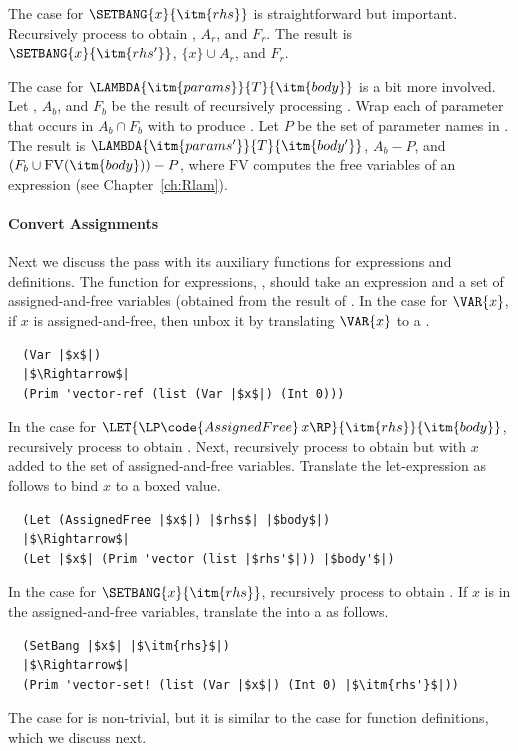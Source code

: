 \documentclass[7x10]{TimesAPriori_MIT}%
\begin{document}
The case for $\SETBANG{x}{\itm{rhs}}$ is straightforward but
important. Recursively process  to obtain , $A_r$,
and $F_r$. The result is $\SETBANG{x}{\itm{rhs'}}$, $\{x\} \cup A_r$,
and $F_r$.

The case for $\LAMBDA{\itm{params}}{T}{\itm{body}}$ is a bit more
involved.  Let , $A_b$, and $F_b$ be the result of
recursively processing . Wrap each of parameter that occurs
in $A_b \cap F_b$ with  to produce .
Let $P$ be the set of parameter names in .  The result is
$\LAMBDA{\itm{params'}}{T}{\itm{body'}}$, $A_b - P$, and $(F_b \cup
\mathrm{FV}(\itm{body})) - P$, where $\mathrm{FV}$ computes the free
variables of an expression (see Chapter~\ref{ch:Rlam}).

\paragraph{Convert Assignments}

Next we discuss the  pass with its auxiliary
functions for expressions and definitions. The function for
expressions, , should take an expression and a
set of assigned-and-free variables (obtained from the result of
. In the case for $\VAR{x}$, if $x$ is
assigned-and-free, then unbox it by translating $\VAR{x}$ to a
.
\begin{lstlisting}
  (Var |$x$|)
  |$\Rightarrow$|
  (Prim 'vector-ref (list (Var |$x$|) (Int 0)))
\end{lstlisting}
%
In the case for $\LET{\LP\code{AssignedFree}\,
  x\RP}{\itm{rhs}}{\itm{body}}$, recursively process  to
obtain .  Next, recursively process  to obtain
 but with $x$ added to the set of assigned-and-free
variables.  Translate the let-expression as follows to bind $x$ to a
boxed value.
\begin{lstlisting}
  (Let (AssignedFree |$x$|) |$rhs$| |$body$|)
  |$\Rightarrow$|
  (Let |$x$| (Prim 'vector (list |$rhs'$|)) |$body'$|)
\end{lstlisting}
%
In the case for $\SETBANG{x}{\itm{rhs}}$, recursively process
 to obtain .  If $x$ is in the assigned-and-free
variables, translate the  into a 
as follows.
\begin{lstlisting}
  (SetBang |$x$| |$\itm{rhs}$|)
  |$\Rightarrow$|
  (Prim 'vector-set! (list (Var |$x$|) (Int 0) |$\itm{rhs'}$|))
\end{lstlisting}
%
The case for  is non-trivial, but it is similar to the
case for function definitions, which we discuss next.
\end{document}
